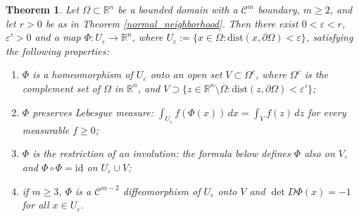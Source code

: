 \documentclass[a4paper,12pt]{amsart}
\newtheorem{theorem}{Theorem}[section]
\newcommand{\R}{\mathbb{R}}
\newcommand{\dist}{\textrm{dist}}
\begin{document}
\begin{theorem} \label{area_preserving} Let $ \Omega \subset \R^n$ be a {bounded} domain with a $\mathcal{C}^m$ boundary, $ m \geq 2$,
{and let $r>0$ be as in Theorem \ref{normal_neighborhood}. Then there exist $0 < \varepsilon < r$, $\varepsilon' > 0$ and a map
$\Phi : U_\varepsilon \to \R^n$, where $U_\varepsilon := \{x \in \Omega : \dist(x,\partial\Omega) < \varepsilon\}$,
satisfying the following properties:}
 \begin{enumerate}
  \item {$\Phi$ is a homeomorphism of $U_\varepsilon$ onto an open set $V \subset \Omega^c$}{, where $\Omega^c$ is the complement set of $\Omega$ in $\R^n$}, {and $V \supset \{ z \in \R^n \setminus \overline\Omega : \dist(z,\partial\Omega) < \varepsilon'\}$;}
  \item {$\Phi$ preserves Lebesgue measure: $\int_{U_\varepsilon} f(\Phi(x))\,dx = \int_V f(z)\,dz$ for every measurable $f \geq 0$;}
  \item {$\Phi$ is the restriction of an involution: the formula below defines $\Phi$ also on $V$, and $\Phi\circ\Phi = \mathrm{id}$ on $U_\varepsilon \cup V$;}
  \item {if $m \geq 3$, $\Phi$ is a $\mathcal{C}^{m-2}$ diffeomorphism of $U_\varepsilon$ onto $V$ and $\det D\Phi (x) = -1$ for all $x \in U_\varepsilon$.}
  \end{enumerate}
\end{theorem}
\end{document}
